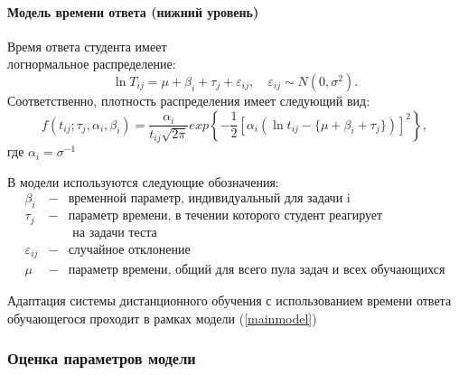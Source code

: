 \paragraph {Модель времени ответа (нижний уровень)}
\label{mvonu}

Время ответа студента имеет \\логнормальное распределение:
\begin{equation}
\label{mainmodel}
\ln T_{ij} = \mu + \beta_i + \tau_j + \varepsilon_{ij},\quad \varepsilon_{ij} \sim N(0,\sigma^2).
\end{equation}
Соответственно, плотность распределения имеет следующий вид:
\begin{equation}
f(t_{ij};\tau_j,\alpha_i,\beta_i) = \frac{\alpha_i}{t_{ij}\sqrt{2\pi}}exp\left\{ -\frac{1}{2}[\alpha_i(\ln t_{ij} - \{\mu + \beta_i + \tau_j\})]^2 \right\},
\end{equation}
где $\alpha_i = \sigma^{-1}$

В модели используются следующие обозначения:
$$
\begin{array}{lll}
\beta_i &-& \mbox{временной параметр, индивидуальный для задачи i}\\
\tau_j &-& \mbox{параметр времени, в течении которого студент реагирует }  \\
& &\mbox{ на задачи теста }\\
\varepsilon_{ij} &-& \mbox{случайное отклонение}\\
\mu &-& \mbox{параметр времени, общий для всего пула задач и всех обучающихся}
\end{array}
$$

Адаптация системы дистанционного обучения с использованием времени ответа обучающегося проходит  в рамках модели (\ref{mainmodel})

\subsubsection{Оценка параметров модели}
\label{opm}

